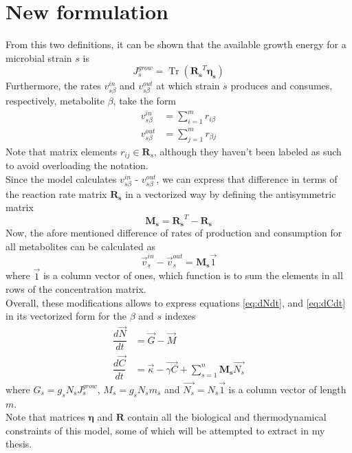 \documentclass{article}
\DeclareMathOperator{\Tr}{Tr}
\begin{document}
	\section{New formulation}
		From this two definitions, it can be shown that the available growth energy for a microbial strain $ s $ is 
		\begin{equation}\label{eq:grow}
			J_s^{grow} = \Tr  (\boldsymbol{R_s}^T\boldsymbol{\eta_s})
		\end{equation}
		Furthermore, the rates $ v_{s\beta}^{in} $ and $ v_{s\beta}^{out} $ at which strain $ s $ produces and consumes, respectively, metabolite $ \beta $, take the form
		\begin{align}
			v_{s\beta}^{in} & = \sum_{i=1}^m r_{i\beta} \\
			v_{s\beta}^{out} & = \sum_{j=1}^m r_{\beta j}
		\end{align}
		Note that matrix elements $ r_{ij} \in \textbf {R}_s$, although they haven't been labeled as such to avoid overloading the notation.\\
		Since the model calculates $ v_{s\beta}^{in} $ - $ v_{s\beta}^{out} $, we can express that difference in terms of the reaction rate matrix $ \boldsymbol{R_s} $ in a vectorized way by defining the antisymmetric matrix 
		\begin{equation}
			\boldsymbol{M_s} = \boldsymbol{R_s}^T - \boldsymbol{R_s} 
		\end{equation}
		Now, the afore mentioned difference of rates of production and consumption for all metabolites can be calculated as 
		\begin{equation}
			\vec{v}_{s}^{in} - \vec{v}_{s}^{out}  = \boldsymbol{M_s}\vec{1}
		\end{equation}
		where $ \vec{1} $ is a column vector of ones, which function is to sum the elements in all rows of the concentration matrix.\\
		Overall, these modifications allows to express equations \ref{eq:dNdt}, and \ref{eq:dCdt} in its vectorized form for the $ \beta $  and $ s $ indexes
		\begin{align}
			\dfrac{d\vec{N}}{dt} &= \vec{G}-\vec{M}\\
			\dfrac{d\vec{C}}{dt} &= \vec{\kappa} - \vec{\gamma C}  + \sum_{s = 1}^{n}\boldsymbol{M_s}\vec{N_s}
		\end{align}
		where $ G_s = g_sN_sJ_s^{grow} $, $ M_s  = g_sN_sm_s$  and $ \vec{N_s} = N_s\vec{1}$ is a column vector of length $ m $. \\
		Note that matrices $ \boldsymbol{\eta} $ and $ \boldsymbol{R} $ contain all the biological and thermodynamical constraints of this model, some of which will be attempted to extract in my thesis.
\end{document}
